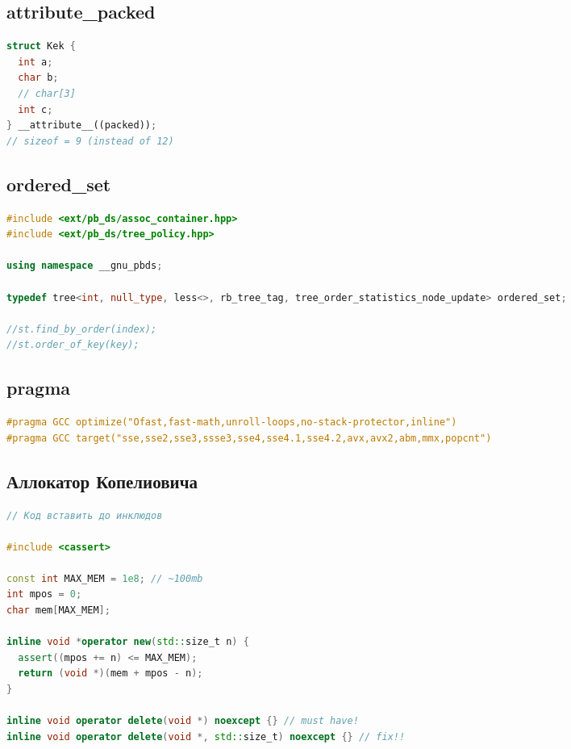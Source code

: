 \documentclass[10pt,a4paper,landscape,twosided]{extarticle}
\begin{document}
\begin{multicols*}{3}
\subsection{attribute\_packed}
\begin{lstlisting}[language=C++]
struct Kek {
  int a;
  char b;
  // char[3]
  int c;
} __attribute__((packed));
// sizeof = 9 (instead of 12)
\end{lstlisting}

\subsection{ordered\_set}
\begin{lstlisting}[language=C++]
#include <ext/pb_ds/assoc_container.hpp>
#include <ext/pb_ds/tree_policy.hpp>

using namespace __gnu_pbds;

typedef tree<int, null_type, less<>, rb_tree_tag, tree_order_statistics_node_update> ordered_set;

//st.find_by_order(index);
//st.order_of_key(key);

\end{lstlisting}

\subsection{pragma}
\begin{lstlisting}[language=C++]
#pragma GCC optimize("Ofast,fast-math,unroll-loops,no-stack-protector,inline")
#pragma GCC target("sse,sse2,sse3,ssse3,sse4,sse4.1,sse4.2,avx,avx2,abm,mmx,popcnt")

\end{lstlisting}

\subsection{Аллокатор Копелиовича}
\begin{lstlisting}[language=C++]
// Код вставить до инклюдов

#include <cassert>

const int MAX_MEM = 1e8; // ~100mb
int mpos = 0;
char mem[MAX_MEM];

inline void *operator new(std::size_t n) {
  assert((mpos += n) <= MAX_MEM);
  return (void *)(mem + mpos - n);
}

inline void operator delete(void *) noexcept {} // must have!
inline void operator delete(void *, std::size_t) noexcept {} // fix!!
\end{lstlisting}


\end{multicols*}
\end{document}
